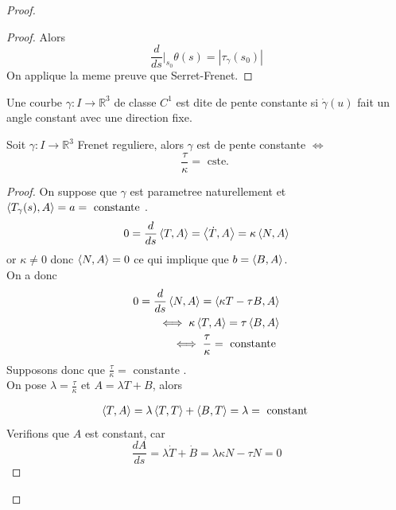 \documentclass[../main.tex]{subfiles}
\begin{document}
\begin{proof}
\begin{propo}
\end{propo}
\begin{proof}
Alors
\[ 
	\frac{d}{ds}\vert_{s_0} \theta( s) = | \tau_{\gamma} ( s_0) |
\]
On applique la meme preuve que Serret-Frenet.

\end{proof}
\begin{defn}
	Une courbe $\gamma:I\to \mathbb{R}^{3}$ de classe $C^{1}$ est dite de pente constante si $\dot{\gamma}( u) $ fait un angle constant avec une direction fixe.
\end{defn}
\begin{propo}
Soit $\gamma:I\to \mathbb{R}^{3}$ Frenet reguliere, alors $\gamma$ est de pente constante $\iff$ 
\[ 
\frac{\tau}{\kappa}= \text{ cste. } 
\]

\end{propo}
\begin{proof}
	On suppose que $\gamma$ est parametree naturellement et $\left\langle T_{\gamma} ( s) , A\right\rangle =a = \text{ constante } $.\\
	\[ 
0 = \frac{d}{ds} \left\langle T,A\right\rangle = \left\langle \dot T, A\right\rangle = \kappa \left\langle N,A\right\rangle 	
	\]
	or $\kappa\neq 0$ donc $\left\langle N,A\right\rangle = 0$ ce qui implique que $b= \left\langle B,A\right\rangle $.\\
	On a donc
	\begin{align*}
	0 = \frac{d}{ds} \left\langle N,A\right\rangle = \left\langle \kappa T- \tau B, A\right\rangle \\
	\iff \kappa \left\langle T,A\right\rangle = \tau \left\langle B,A\right\rangle \\
	\iff \frac{\tau}{\kappa}= \text{ constante } 	
	\end{align*}
Supposons donc que $\frac{\tau}{\kappa}= \text{ constante } $.\\
On pose $\lambda = \frac{\tau}{\kappa}$ et $A= \lambda T + B$, alors

\begin{align*}
	\left\langle T,A\right\rangle = \lambda \left\langle T,T\right\rangle + \left\langle B,T\right\rangle = \lambda = \text{ constant } 
\end{align*}
Verifions que $A$ est constant, car
\[ 
\frac{dA}{ds}= \lambda \dot T + \dot B = \lambda \kappa N - \tau N = 0
\]
\end{proof}

\end{proof}
\end{document}

